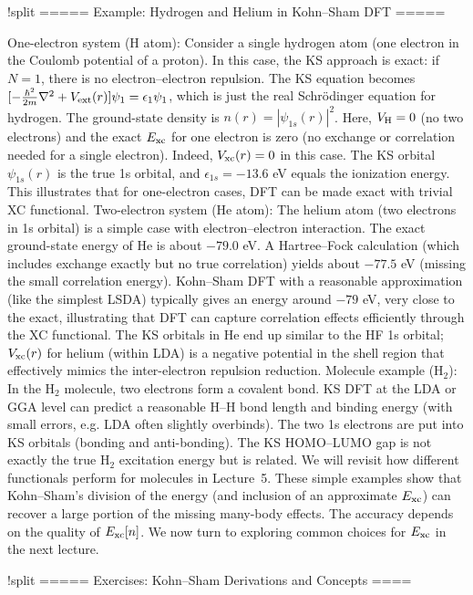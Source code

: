 !split
===== Example: Hydrogen and Helium in Kohn–Sham DFT =====

One-electron system (H atom): Consider a single hydrogen atom (one electron in the Coulomb potential of a proton). In this case, the KS approach is exact: if $N=1$, there is no electron–electron repulsion. The KS equation becomes $[-\frac{\hbar^2}{2m}\nabla^2 + V_{\rm ext}(r)]\psi_1 = \epsilon_1 \psi_1$, which is just the real Schrödinger equation for hydrogen. The ground-state density is $n(r)=|\psi_{1s}(r)|^2$. Here, $V_{\rm H}=0$ (no two electrons) and the exact $E_{\rm xc}$ for one electron is zero (no exchange or correlation needed for a single electron). Indeed, $V_{\rm xc}(r)=0$ in this case. The KS orbital $\psi_{1s}(r)$ is the true 1s orbital, and $\epsilon_{1s} = -13.6$ eV equals the ionization energy. This illustrates that for one-electron cases, DFT can be made exact with trivial XC functional.
Two-electron system (He atom): The helium atom (two electrons in 1s orbital) is a simple case with electron–electron interaction. The exact ground-state energy of He is about $-79.0$ eV. A Hartree–Fock calculation (which includes exchange exactly but no true correlation) yields about $-77.5$ eV (missing the small correlation energy). Kohn–Sham DFT with a reasonable approximation (like the simplest LSDA) typically gives an energy around $-79$ eV, very close to the exact, illustrating that DFT can capture correlation effects efficiently through the XC functional. The KS orbitals in He end up similar to the HF 1s orbital; $V_{\rm xc}(r)$ for helium (within LDA) is a negative potential in the shell region that effectively mimics the inter-electron repulsion reduction.
Molecule example (H$_2$): In the H$_2$ molecule, two electrons form a covalent bond. KS DFT at the LDA or GGA level can predict a reasonable H–H bond length and binding energy (with small errors, e.g. LDA often slightly overbinds). The two 1s electrons are put into KS orbitals (bonding and anti-bonding). The KS HOMO–LUMO gap is not exactly the true H$_2$ excitation energy but is related. We will revisit how different functionals perform for molecules in Lecture 5.
These simple examples show that Kohn–Sham’s division of the energy (and inclusion of an approximate $E_{\rm xc}$) can recover a large portion of the missing many-body effects. The accuracy depends on the quality of $E_{\rm xc}[n]$. We now turn to exploring common choices for $E_{\rm xc}$ in the next lecture.

!split
===== Exercises: Kohn–Sham Derivations and Concepts ====

